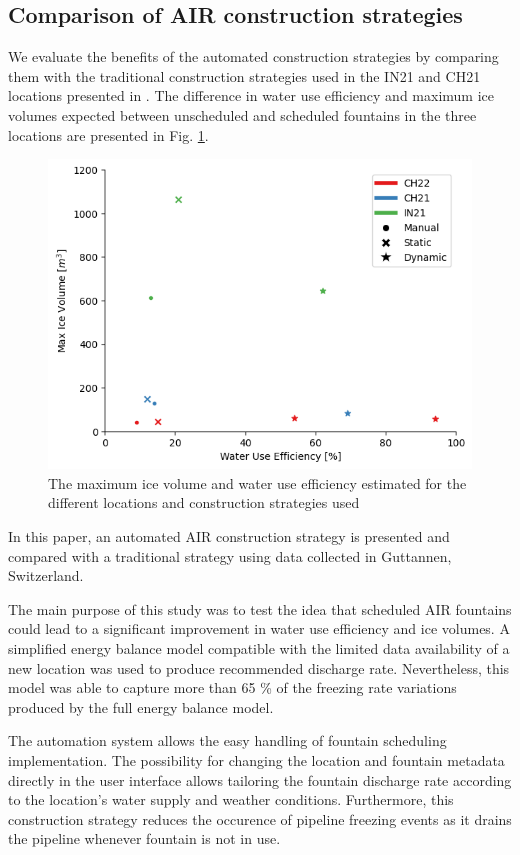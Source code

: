 \documentclass[tc, manuscript]{copernicus}
\begin{document}
\subsection{Comparison of AIR construction strategies}
We evaluate the benefits of the automated construction strategies by comparing them with the
traditional construction strategies used in the IN21 and CH21 locations presented in
\cite{balasubramanianInfluenceMeteorologicalConditions2022}. The difference in water use efficiency and maximum
ice volumes expected between unscheduled and scheduled fountains in the three locations are presented in Fig.
\ref{fig:wue}.

\begin{figure}[t]
\includegraphics[width=12cm]{Figures/wue.png}
\caption{The maximum ice volume and water use efficiency estimated for the different locations and construction
strategies used} 
\label{fig:wue} 
\end{figure}


\conclusions
In this paper, an automated AIR construction strategy is presented and compared with a traditional strategy
using data collected in Guttannen, Switzerland.

The main purpose of this study was to test the idea that scheduled AIR fountains could lead to a significant
improvement in water use efficiency and ice volumes. A simplified energy balance model compatible with the
limited data availability of a new location was used to produce recommended discharge rate. Nevertheless, this
model was able to capture more than 65 \% of the freezing rate variations produced by the full energy balance
model.

The automation system allows the easy handling of fountain scheduling implementation. The possibility for
changing the location and fountain metadata directly in the user interface allows tailoring the fountain discharge rate
according to the location's water supply and weather conditions. Furthermore, this construction strategy reduces
the occurence of pipeline freezing events as it drains the pipeline whenever fountain is not in use.
\end{document}
